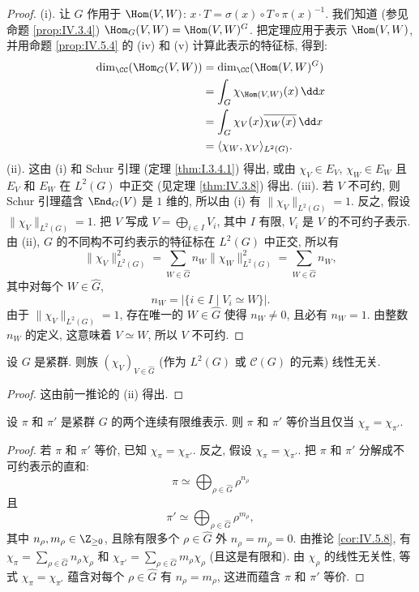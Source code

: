 \begin{proof}
(i). 让 $G$ 作用于 $\Hom(V, W)$: $x \cdot T = \sigma(x) \circ T \circ \pi(x)^{-1}$. 我们知道 (参见命题 \ref{prop:IV.3.4}) $\Hom_G(V, W) = \Hom(V, W)^G$. 把定理应用于表示 $\Hom(V, W)$, 并用命题 \ref{prop:IV.5.4} 的 (iv) 和 (v) 计算此表示的特征标, 得到:
\begin{align*}
\dim_{\CC}(\Hom_G(V, W)) &= \dim_{\CC}(\Hom(V, W)^G) \\
&= \int_G \chi_{\Hom(V,W)}(x)\,\dd x \\
&= \int_G \chi_V(x)\overline{\chi_W(x)}\,\dd x \\
&= \langle \chi_W, \chi_V \rangle_{L^2(G)}.
\end{align*}
(ii). 这由 (i) 和 Schur 引理 (定理 \ref{thm:I.3.4.1}) 得出, 或由 $\chi_V \in E_V$, $\chi_W \in E_W$ 且 $E_V$ 和 $E_W$ 在 $L^2(G)$ 中正交 (见定理 \ref{thm:IV.3.8}) 得出.
(iii). 若 $V$ 不可约, 则 Schur 引理蕴含 $\End_G(V)$ 是 $1$ 维的, 所以由 (i) 有 $\|\chi_V\|_{L^2(G)} = 1$. 反之, 假设 $\|\chi_V\|_{L^2(G)} = 1$. 把 $V$ 写成 $V = \bigoplus_{i \in I}V_i$, 其中 $I$ 有限, $V_i$ 是 $V$ 的不可约子表示. 由 (ii), $G$ 的不同构不可约表示的特征标在 $L^2(G)$ 中正交, 所以有
\[
\|\chi_V\|_{L^2(G)}^2 = \sum_{W \in \widehat{G}}n_W\|\chi_W\|_{L^2(G)}^2 = \sum_{W \in \widehat{G}}n_W,
\]
其中对每个 $W \in \widehat{G}$,
\[
n_W = |\{i \in I \mid V_i \simeq W\}|.
\]
由于 $\|\chi_V\|_{L^2(G)} = 1$, 存在唯一的 $W \in \widehat{G}$ 使得 $n_W \neq 0$, 且必有 $n_W = 1$. 由整数 $n_W$ 的定义, 这意味着 $V \simeq W$, 所以 $V$ 不可约.
\end{proof}

\begin{corollary}[特征标的线性无关性]
\label{cor:IV.5.9}
设 $G$ 是紧群. 则族 $(\chi_V)_{V \in \widehat{G}}$ (作为 $L^2(G)$ 或 $\mathcal{C}(G)$ 的元素) 线性无关.
\end{corollary}

\begin{proof}
这由前一推论的 (ii) 得出.
\end{proof}

\begin{corollary}[特征标确定表示]
\label{cor:IV.5.10}
设 $\pi$ 和 $\pi'$ 是紧群 $G$ 的两个连续有限维表示. 则 $\pi$ 和 $\pi'$ 等价当且仅当 $\chi_{\pi} = \chi_{\pi'}$.
\end{corollary}

\begin{proof}
若 $\pi$ 和 $\pi'$ 等价, 已知 $\chi_{\pi} = \chi_{\pi'}$. 反之, 假设 $\chi_{\pi} = \chi_{\pi'}$. 把 $\pi$ 和 $\pi'$ 分解成不可约表示的直和:
\[
\pi \simeq \bigoplus_{\rho \in \widehat{G}}\rho^{n_{\rho}}
\]
且
\[
\pi' \simeq \bigoplus_{\rho \in \widehat{G}}\rho^{m_{\rho}},
\]
其中 $n_{\rho}, m_{\rho} \in \Z_{\geq 0}$, 且除有限多个 $\rho \in \widehat{G}$ 外 $n_{\rho} = m_{\rho} = 0$. 由推论 \ref{cor:IV.5.8}, 有 $\chi_{\pi} = \sum_{\rho \in \widehat{G}}n_{\rho}\chi_{\rho}$ 和 $\chi_{\pi'} = \sum_{\rho \in \widehat{G}}m_{\rho}\chi_{\rho}$ (且这是有限和). 由 $\chi_{\rho}$ 的线性无关性, 等式 $\chi_{\pi} = \chi_{\pi'}$ 蕴含对每个 $\rho \in \widehat{G}$ 有 $n_{\rho} = m_{\rho}$, 这进而蕴含 $\pi$ 和 $\pi'$ 等价.
\end{proof}

